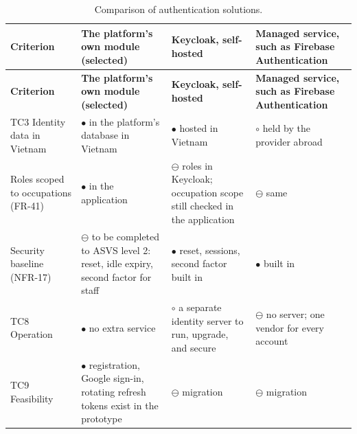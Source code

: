 {\small
\begin{longtable}{|>{\raggedright\arraybackslash}p{}|>{\raggedright\arraybackslash}p{}|>{\raggedright\arraybackslash}p{}|>{\raggedright\arraybackslash}p{}|}
\caption{Comparison of authentication solutions.} \\
\hline
\textbf{Criterion} & \textbf{The platform's own module (selected)} & \textbf{Keycloak, self-hosted\cite{r186}} & \textbf{Managed service, such as Firebase Authentication\cite{r187}} \\ \hline
\endfirsthead
\hline
\textbf{Criterion} & \textbf{The platform's own module (selected)} & \textbf{Keycloak, self-hosted\cite{r186}} & \textbf{Managed service, such as Firebase Authentication\cite{r187}} \\ \hline
\endhead
TC3 Identity data in Vietnam & $\bullet$ in the platform's database in Vietnam & $\bullet$ hosted in Vietnam & $\circ$ held by the provider abroad \\ \hline
Roles scoped to occupations (FR-41) & $\bullet$ in the application & $\ominus$ roles in Keycloak; occupation scope still checked in the application & $\ominus$ same \\ \hline
Security baseline (NFR-17) & $\ominus$ to be completed to ASVS level 2\cite{r157}: reset, idle expiry, second factor for staff & $\bullet$ reset, sessions, second factor built in & $\bullet$ built in \\ \hline
TC8 Operation & $\bullet$ no extra service & $\circ$ a separate identity server to run, upgrade, and secure & $\ominus$ no server; one vendor for every account \\ \hline
TC9 Feasibility & $\bullet$ registration, Google sign-in, rotating refresh tokens exist in the prototype & $\ominus$ migration & $\ominus$ migration \\ \hline
\end{longtable}
}

